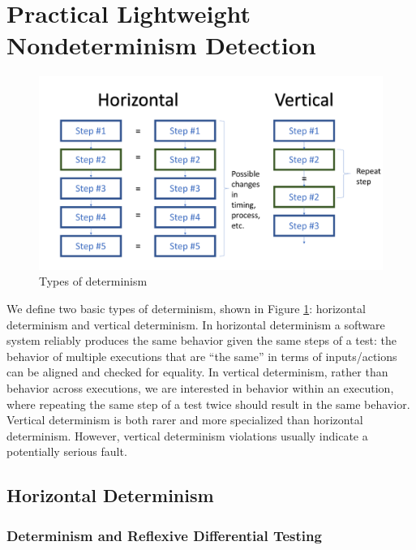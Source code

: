 \section{Practical Lightweight Nondeterminism
  Detection}

\begin{figure}
\includegraphics[width=\columnwidth]{types}
\caption{Types of determinism}
\label{fig:types}
\end{figure}

We define two basic types of determinism, shown in Figure
\ref{fig:types}:  horizontal determinism and vertical determinism.  In
horizontal determinism a software system reliably
produces the same behavior given the same steps of a test: the
behavior of multiple executions that are ``the same'' in terms of
inputs/actions can be aligned and checked for equality.  In
vertical determinism, rather than behavior across executions, we are
interested in behavior within an execution, where repeating the same
step of a test twice should result in the same behavior.  Vertical determinism is both rarer and more specialized than
horizontal determinism.  However, vertical
determinism violations usually indicate a potentially serious fault.

\subsection{Horizontal Determinism}


\subsubsection{Determinism and Reflexive Differential Testing}

